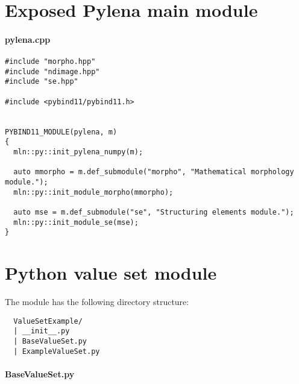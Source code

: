 \clearpage

\section{Exposed Pylena main module}
\label{appendix:static-dynamic-bridge.pylena}

\paragraph{pylena.cpp}

\begin{verbatim}
#include "morpho.hpp"
#include "ndimage.hpp"
#include "se.hpp"

#include <pybind11/pybind11.h>


PYBIND11_MODULE(pylena, m)
{
  mln::py::init_pylena_numpy(m);

  auto mmorpho = m.def_submodule("morpho", "Mathematical morphology module.");
  mln::py::init_module_morpho(mmorpho);

  auto mse = m.def_submodule("se", "Structuring elements module.");
  mln::py::init_module_se(mse);
}
\end{verbatim}


\clearpage

\section{Python value set module}
\label{appendix:static-dynamic-bridge.python.vs}

The module has the following directory structure:
\begin{verbatim}
  ValueSetExample/
  | __init__.py
  | BaseValueSet.py
  | ExampleValueSet.py
\end{verbatim}

\paragraph{BaseValueSet.py}


